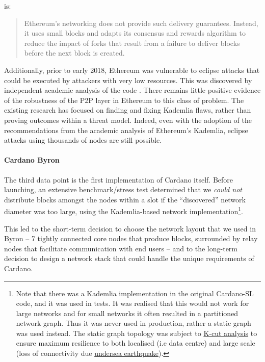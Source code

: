 \documentclass[11pt,a4paper]{article}
\begin{document}
is:

\begin{quote}
Ethereum's networking does not provide such delivery guarantees.
Instead, it uses small blocks and adapts its consensus and rewards
algorithm to reduce the impact of forks that result from a failure to
deliver blocks before the next block is created.
\end{quote}

Additionally, prior to early 2018, Ethereum was vulnerable to eclipse
attacks that could be executed by attackers with very low resources.
This was discovered by independent academic analysis of the code
\cite{MHG18}. There remains little positive evidence of the robustness of
the P2P layer in Ethereum to this class of problem. The existing
research has focused on finding and fixing Kademlia flaws, rather than
proving outcomes within a threat model. Indeed, even with the adoption
of the recommendations from the academic analysis of Ethereum's
Kademlia, eclipse attacks using thousands of nodes are still possible.

\paragraph{Cardano Byron}

The third data point is the first implementation of Cardano itself.
Before launching, an extensive benchmark/stress test determined that we
\emph{could not} distribute blocks amongst the nodes within a slot if
the ``discovered'' network diameter was too large, using the
Kademlia-based network implementation\footnote{Note that there was a
  Kademlia implementation in the original Cardano-SL code, and it was
  used in tests. It was realised that this would not work for large
  networks and for small networks it often resulted in a partitioned
  network graph. Thus it was never used in production, rather a static
  graph was used instead. The static graph topology was subject to
  \href{https://en.wikipedia.org/wiki/Minimum_k-cut}{{K-cut analysis}}
  to ensure maximum resilience to both localised (i.e data centre) and
  large scale (loss of connectivity due
  \href{https://www.telecomramblings.com/2010/06/subsea-quakes-and-transatlantic-cable-diversity/}{{undersea
  earthquake}}).}.

This led to the short-term decision to choose the network layout that we
used in Byron -- 7 tightly connected core nodes that produce blocks,
surrounded by relay nodes that facilitate communication with end users
-- and to the long-term decision to design a network stack that could
handle the unique requirements of Cardano.
\end{document}
